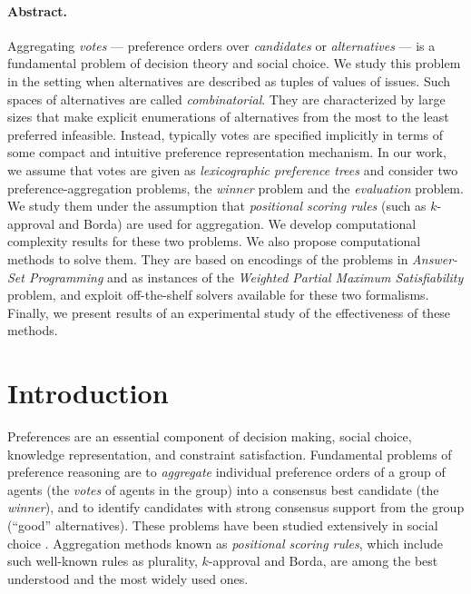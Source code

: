 \paragraph{\bf Abstract.}
Aggregating \emph{votes} --- preference orders over \emph{candidates} 
or \emph{alternatives} --- is a fundamental problem of decision theory 
and social choice. We study this problem in the setting when 
alternatives are described as tuples of values of issues. Such spaces of 
alternatives are called \emph{combinatorial}. They are characterized by 
large sizes that make explicit enumerations of alternatives from the most 
to the least preferred infeasible. Instead, typically votes are specified 
implicitly 
in terms of some compact and intuitive preference representation mechanism. 
In our work, we assume that votes are given as \textit{lexicographic 
preference trees} and consider two preference-aggregation problems, the 
\emph{winner} problem and the \emph{evaluation} problem. We study them 
under the assumption that \textit{positional scoring rules} (such as 
$k$-approval and Borda) are used for aggregation. We develop computational 
complexity results for these two problems. We also propose computational 
methods to solve 
them. They are based on encodings of the problems in \textit{Answer-Set 
Programming} and as instances of the \textit{Weighted Partial Maximum 
Satisfiability} problem, and exploit off-the-shelf solvers available for 
these two formalisms. Finally, we present results of an experimental study 
of the effectiveness of these methods.

\section{Introduction}
Preferences are an essential component of decision making, social choice,
knowledge representation, and constraint satisfaction. Fundamental 
problems of preference reasoning are to \emph{aggregate} individual 
preference orders of a group of agents (the \emph{votes} of agents in 
the group) into a consensus best candidate (the \emph{winner}), and to 
identify candidates with strong consensus support from the group 
(``good'' alternatives). These problems
have been studied extensively in social choice \cite{arrowhandbook}. 
Aggregation methods known as \emph{positional scoring rules}, which include
such well-known rules as plurality, $k$-approval and Borda, are
among the best understood and the most widely used ones.
 
